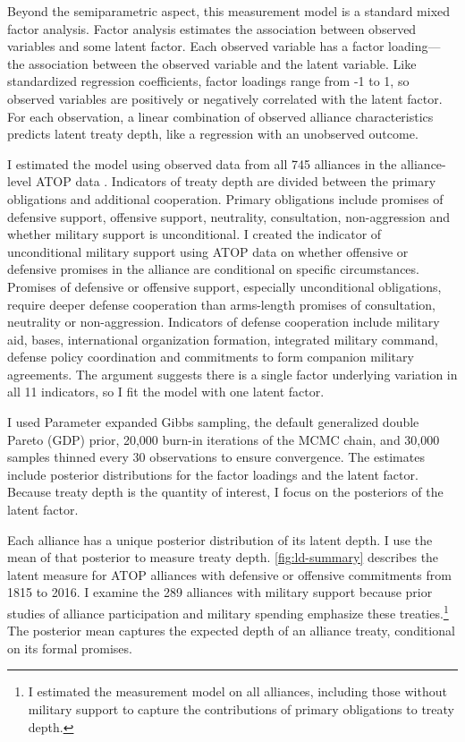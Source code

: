 \documentclass[12pt]{article}
\begin{document}
Beyond the semiparametric aspect, this measurement model is a standard mixed factor analysis.
Factor analysis estimates the association between observed variables and some latent factor.
Each observed variable has a factor loading--- the association between the observed variable and the latent variable.  
Like standardized regression coefficients, factor loadings range from -1 to 1, so observed variables are positively or negatively correlated with the latent factor.  
For each observation, a linear combination of observed alliance characteristics predicts latent treaty depth, like a regression with an unobserved outcome.  


I estimated the model using observed data from all 745 alliances in the alliance-level ATOP data \citep{Leedsetal2002}. 
Indicators of treaty depth are divided between the primary obligations and additional cooperation.
Primary obligations include promises of defensive support, offensive support, neutrality, consultation, non-aggression and whether military support is unconditional. 
I created the indicator of unconditional military support using ATOP data on whether offensive or defensive promises in the alliance are conditional on specific circumstances. 
Promises of defensive or offensive support, especially unconditional obligations, require deeper defense cooperation than arms-length promises of consultation, neutrality or non-aggression. 
Indicators of defense cooperation include military aid, bases, international organization formation, integrated military command, defense policy coordination and commitments to form companion military agreements. 
The argument suggests there is a single factor underlying variation in all 11 indicators, so I fit the model with one latent factor. 


I used Parameter expanded Gibbs sampling, the default generalized double Pareto (GDP) prior, 20,000 burn-in iterations of the MCMC chain, and 30,000 samples thinned every 30 observations to ensure convergence. 
The estimates include posterior distributions for the factor loadings and the latent factor. 
Because treaty depth is the quantity of interest, I focus on the posteriors of the latent factor. 


Each alliance has a unique posterior distribution of its latent depth. 
I use the mean of that posterior to measure treaty depth. 
\autoref{fig:ld-summary} describes the latent measure for ATOP alliances with defensive or offensive commitments from 1815 to 2016.
I examine the 289 alliances with military support because prior studies of alliance participation and military spending emphasize these treaties.\footnote{
I estimated the measurement model on all alliances, including those without military support to capture the contributions of primary obligations to treaty depth.}
The posterior mean captures the expected depth of an alliance treaty, conditional on its formal promises. 
\end{document}
